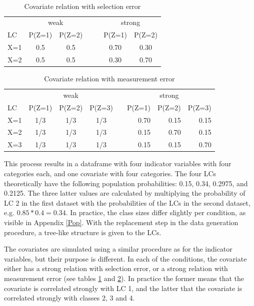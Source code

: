 \documentclass[a4paper, 11pt]{article} %
\begin{document}
\begin{table}[bh]
\centering
\caption{Covariate relation with selection error}\\
\vspace{1}
\begin{tabular}{l cc l l cc}
 \hline
& \multicolumn{2}{c}{weak} &&&  \multicolumn{2}{c}{strong}  \\
\cline{2-3} 
\cline{6-7}
 LC & P(Z=1) & P(Z=2)  &&&   P(Z=1) & P(Z=2)  \\ 
  \hline
 X=1  & 0.5 & 0.5 &&& 0.70 & 0.30  \\ 
  X=2 & 0.5 & 0.5 &&& 0.30 & 0.70  \\ 
  \hline
  \end{tabular}
  \label{tab:selectionerrorCOV}
\end{table}



\begin{table}[h]
\caption{Covariate relation with measurement error}
\centering
\begin{tabular}{l ccc r rrr }
 \hline
  &  \multicolumn{3}{c}{weak} && \multicolumn{3}{c}{strong} \\
\cline{2-4} 
\cline{6-8}  
 LC & P(Z=1) & P(Z=2) & P(Z=3) &&  P(Z=1) & P(Z=2) & P(Z=3)\\ 
  \hline
  X=1 & 1/3 & 1/3 &1/3 &&0.70 & 0.15 & 0.15 \\ 
  X=2 &  1/3 & 1/3 &1/3 &&0.15 & 0.70 & 0.15 \\ 
  X=3 &  1/3 & 1/3 &1/3 &&0.15 & 0.15 & 0.70 \\ 
  \hline
  \end{tabular}
    \label{tab:measurementerrorCOV}
\end{table}
This process results in a dataframe with four indicator variables with four categories each, and one covariate with four categories. The four LCs theoretically have the following population probabilities: 0.15, 0.34, 0.2975, and 0.2125. The three latter values are calculated by multiplying the probability of LC 2 in the first dataset with the probabilities of the LCs in the second dataset, e.g. $0.85*0.4=0.34$. In practice, the class sizes differ slightly per condition, as visible in Appendix \ref{Pop}. With the replacement step in the data generation procedure, a tree-like structure is given to the LCs. %

The covariates are simulated using a similar procedure as for the indicator variables, but their purpose is different. In each of the conditions, the covariate either has a strong relation with selection error, or a strong relation with measurement error (see tables \ref{tab:selectionerrorCOV} and \ref{tab:measurementerrorCOV}). In practice the former means that the covariate is correlated strongly with LC 1, and the latter that the covariate is correlated strongly with classes 2, 3 and 4.
\end{document}
